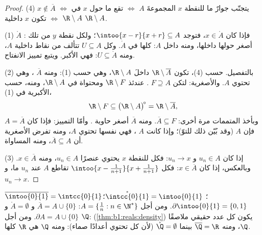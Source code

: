 \begin{proof}
(4) $x \notin \overline A$ $\iff$ يتجنّب جوارٌ ما للنقطة $x$ المجموعةَ $A$
$\iff$ تقع  ما حول $x$ في $\R \setminus A$ $\iff$ تكون $x$
داخلية  $\R \setminus A$.

(1)  $\mathring A$ : فإذا كان $x \in \mathring A$، فتوجد
$\intoo{x-r}{x+r} \subseteq A$؛ ولكل نقطة $y$ من تلك 
 أصغر حولها داخلها، ومنه داخل $A$:  كلها
في $\mathring A$. وكل  $U \subseteq A$ تتألف من
نقاط داخلية  $A$، ومنه $U \subseteq \mathring A$: فهي الأكبر. ويتبع
تمييز الانفتاح.

(2) بالتفصيل. حسب (4)، تكون $\R \setminus \overline A$ داخلَ
$\R \setminus A$، وهي  حسب (1): ومنه  $\overline A$
، وهي تحتوي $A$. والأصغرية: لتكن $F \supseteq A$
. عندئذ $\R \setminus F$  ومحتواة في $\R
\setminus A$، ومنه، حسب الأكبرية في (1)،
\[
\R \setminus F \subseteq \bigl(\R \setminus A\bigr)^{\!\circ}
= \R \setminus \overline A ,
\]
وبأخذ المتممات مرة أخرى: $\overline A \subseteq F$. ومنه 
$\overline A$ أصغر حاوية . وأمّا التمييز:
فإذا كان $A = \overline A$ فإن $A$  (وقد بُيّن ذلك للتوّ)؛ وإذا كانت $A$
، فهي نفسها  تحتوي $A$، ومنه تفرض الأصغرية
أن $\overline A \subseteq A$، ومنه المساواة.

(3) إذا كان $u_n \in A$ و $u_n \to x$: فكل  للنقطة $x$ يحتوي
عنصرًا $u_n \in A$، ومنه $x \in \overline A$. وبالعكس، إذا كان $x \in
\overline A$: فكل  $\intoo{x - \frac{1}{n+1}}{x +
\frac{1}{n+1}}$ تقاطع $A$ عند $u_n$ ما، و $u_n \to x$.
\end{proof}

\begin{example}\label{ex:b1:topology:closureexamples}
$\overline{\intoo{0}{1}} = \intcc{0}{1}$؛
$\mathring{\intcc{0}{1}} = \intoo{0}{1}$؛ $\partial\intoo{0}{1} =
\{0, 1\}$. ومن أجل $A = \{\frac 1n : n \in \N^*\}$: $\overline A = A
\cup \{0\}$ و $\mathring A = \emptyset$ و $\partial A = A \cup \{0\}$.
ومن أجل $\Q$:  (\cref{thm:b1:reals:density}) يكون كل عدد حقيقي
ملاصقًا  $\Q$، ومنه $\overline{\Q} = \R$ بينما $\mathring{\Q} =
\emptyset$ (لأن كل  تحتوي أعدادًا صماء): ومنه 
$\Q$ هي $\R$ كلها.
\end{example}

